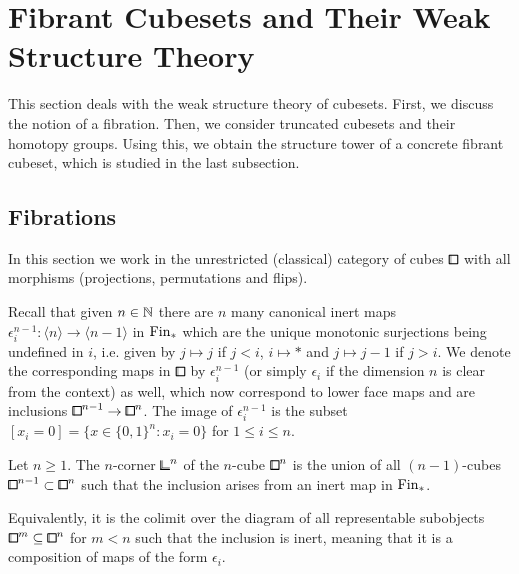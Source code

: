 \section{Fibrant Cubesets and Their Weak Structure Theory}
This section deals with the weak structure theory of cubesets.
First, we discuss the notion of a fibration. Then, we consider truncated cubesets and their homotopy groups.
Using this, we obtain the structure tower of a concrete fibrant cubeset, which is studied in the last subsection.

\subsection{Fibrations}\label{ssec:fibrations}


In this section we work in the unrestricted (classical) category of cubes $\bbox$
with all morphisms (projections, permutations and flips).

Recall that given $n\in{\mathbb{N}}$ there are $n$ many canonical inert maps $\epsilon^{n-1}_i\colon\langle n\rangle\to\langle n-1\rangle$ in $\mathrm{Fin}_\ast$ which are
the unique monotonic surjections being undefined in $i$, i.e. given by $j\mapsto j$ if $j<i$, $i\mapsto\ast$ and $j\mapsto j-1$ if $j>i$.
We denote the corresponding maps in $\bbox$ by $\epsilon_i^{n-1}$
(or simply $\epsilon_i$ if the dimension $n$ is clear from the context) as well,
which now correspond to lower face maps and are inclusions ${\bbox}^{n-1}\to{\bbox}^n$.
The image of $\epsilon_i^{n-1}$ is the subset $[x_i = 0] = \{x\in\{0,1\}^n : x_i = 0\}$ for $1\leq i\leq n$.

\begin{definition}\label{def:corner}
Let $n\geq 1$.
The $n$-corner ${\bbcor}^n$ of the $n$-cube ${\bbox}^n$ is the union of all $(n-1)$-cubes ${\bbox}^{n-1}\subset{\bbox}^n$ such that the inclusion arises from an inert map in $\mathrm{Fin}_\ast$.

Equivalently, it is the colimit over the diagram of all representable subobjects
${\bbox}^m\sub{\bbox}^n$ for $m<n$ such that the inclusion is inert,
meaning that it is a composition of maps of the form $\epsilon_i$.
\end{definition}

